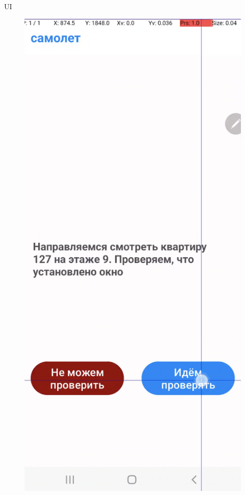 \documentclass{beamer}%
\begin{document}
\begin{frame}{UI}
\begin{changemargin}
\footnotesize


\begin{figure}[h]
\begin{minipage}[h]{0.3\linewidth}
\hbox{\hspace{-2em}\includegraphics[width=\linewidth]{img/app_ui}}
\end{minipage}
\end{figure}

\end{changemargin}
\end{frame}
\end{document}
